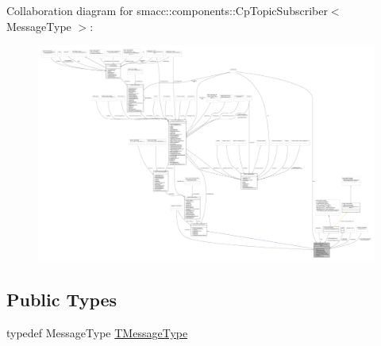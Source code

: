 Collaboration diagram for smacc\+:\+:components\+:\+:Cp\+Topic\+Subscriber$<$ Message\+Type $>$\+:
\nopagebreak
\begin{figure}[H]
\begin{center}
\leavevmode
\includegraphics[width=350pt]{classsmacc_1_1components_1_1CpTopicSubscriber__coll__graph}
\end{center}
\end{figure}
\subsection*{Public Types}
\begin{DoxyCompactItemize}
\item 
typedef Message\+Type \hyperlink{classsmacc_1_1components_1_1CpTopicSubscriber_acdc1cefead832fd249b0fceb2c3b28b0}{T\+Message\+Type}
\end{DoxyCompactItemize}
